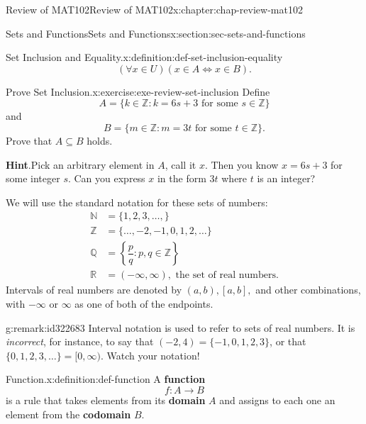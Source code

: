 \documentclass[oneside,10pt,]{book}
\newcommand{\blocktitlefont}{\relax}
\newcommand{\terminology}[1]{\textbf{#1}}
\numberwithin{equation}{section}
\newcommand{\amp}{&}
\begin{document}
\begin{chapterptx}{Review of MAT102}{}{Review of MAT102}{}{}{x:chapter:chap-review-mat102}
\begin{sectionptx}{Sets and Functions}{}{Sets and Functions}{}{}{x:section:sec-sets-and-functions}
\begin{definition}{Set Inclusion and Equality.}{x:definition:def-set-inclusion-equality}
\begin{equation*}
(\forall x \in U)(x \in A \Leftrightarrow x \in B)\text{.}
\end{equation*}
%
\end{definition}
\begin{inlineexercise}{Prove Set Inclusion.}{x:exercise:exe-review-set-inclusion}%
Define%
\begin{equation*}
A = \{k \in \mathbb{Z} : k = 6s + 3 \text{ for some } s \in \mathbb{Z}\}
\end{equation*}
and%
\begin{equation*}
B = \{m \in \mathbb{Z} : m = 3t \text{ for some } t \in \mathbb{Z}\}\text{.}
\end{equation*}
Prove that \(A \subseteq B\) holds.%
\par\smallskip%
\noindent\textbf{\blocktitlefont Hint}.\hypertarget{g:hint:id325120}{}\quad{}Pick an arbitrary element in \(A\), call it \(x\). Then you know \(x = 6s + 3\) for some integer \(s\). Can you express \(x\) in the form \(3t\) where \(t\) is an integer?%
\end{inlineexercise}
We will use the standard notation for these sets of numbers: \label{g:notation:id322580}\label{g:notation:id322569}\label{g:notation:id322592}\label{g:notation:id322616}\label{g:notation:id322611}%
\begin{align*}
\mathbb{N} \amp = \{1,2,3,\ldots,\}\\
\mathbb{Z} \amp = \{\ldots,-2,-1,0,1,2,\ldots\}\\
\mathbb{Q} \amp = \left\{\dfrac{p}{q} : p,q \in \mathbb{Z}\right\}\\
\mathbb{R} \amp = (-\infty,\infty), \text{ the set of real numbers.}
\end{align*}
Intervals of real numbers are denoted by \((a,b), [a,b],\) and other combinations, with \(-\infty\) or \(\infty\) as one of both of the endpoints.%
\begin{remark}{}{g:remark:id322683}%
Interval notation is used to refer to sets of real numbers. It is \emph{incorrect}, for instance, to say that \((-2,4) = \{-1,0,1,2,3\}\), or that \(\{0,1,2,3,\ldots\} = [0,\infty)\). Watch your notation!%
\end{remark}
\begin{definition}{Function.}{x:definition:def-function}%
\label{g:notation:id322729}%
A \terminology{function}%
\begin{equation*}
f: A \rightarrow B
\end{equation*}
is a rule that takes elements from its \terminology{domain} \(A\) and assigns to each one an element from the \terminology{codomain} \(B\).%

\end{definition}
\end{sectionptx}
\end{chapterptx}
\end{document}
